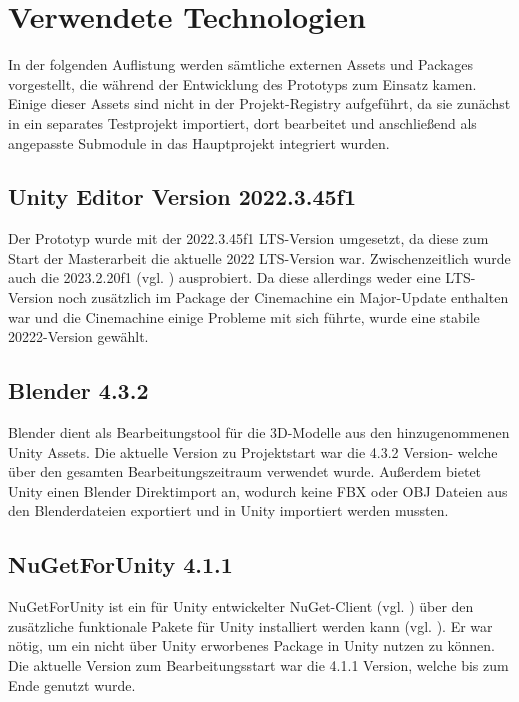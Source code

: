 \section{Verwendete Technologien}

In der folgenden Auflistung werden sämtliche externen Assets und Packages vorgestellt, die während der Entwicklung des Prototyps zum Einsatz kamen. Einige dieser Assets sind nicht in der Projekt-Registry aufgeführt, da sie zunächst in ein separates Testprojekt importiert, dort bearbeitet und anschließend als angepasste Submodule in das Hauptprojekt integriert wurden.

\subsection{Unity Editor Version 2022.3.45f1}
Der Prototyp wurde mit der 2022.3.45f1 \ac{LTS}-Version umgesetzt, da diese zum Start der Masterarbeit die aktuelle 2022 \ac{LTS}-Version war. Zwischenzeitlich wurde auch die 2023.2.20f1 (vgl. \citealp{noauthor_unity_nodate}) ausprobiert. Da diese allerdings weder eine \ac{LTS}-Version noch zusätzlich im Package der Cinemachine ein Major-Update enthalten war und die Cinemachine einige Probleme mit sich führte, wurde eine stabile 20222-Version gewählt.

\subsection{Blender 4.3.2}
Blender dient als Bearbeitungstool für die 3D-Modelle aus den hinzugenommenen Unity Assets. Die aktuelle Version zu Projektstart war die 4.3.2 Version- welche über den gesamten Bearbeitungszeitraum verwendet wurde. Außerdem bietet Unity einen Blender Direktimport an, wodurch keine \ac{FBX} oder \ac{OBJ} Dateien aus den Blenderdateien exportiert und in Unity importiert werden mussten.

\subsection{NuGetForUnity 4.1.1}
NuGetForUnity ist ein für Unity entwickelter NuGet-Client (vgl. \citealp{noauthor_nuget_nodate}) über den zusätzliche funktionale Pakete für Unity installiert werden kann (vgl. \citealp{mccarthy_glitchenzonugetforunity_2025}). Er war nötig, um ein nicht über Unity erworbenes Package in Unity nutzen zu können. Die aktuelle Version zum Bearbeitungsstart war die 4.1.1 Version, welche bis zum Ende genutzt wurde.

